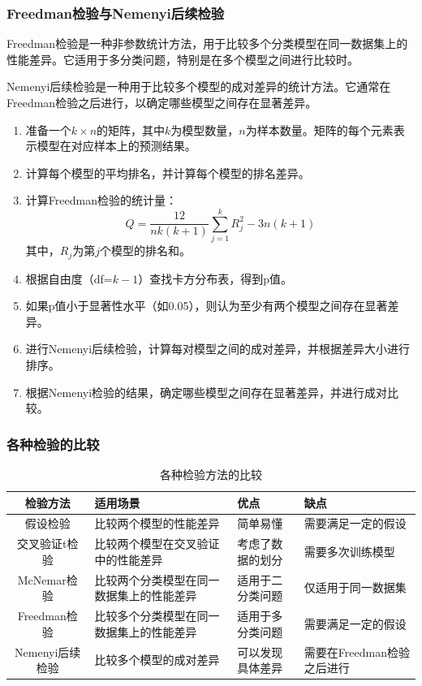 \subsubsection{Freedman检验与Nemenyi后续检验}
Freedman检验是一种非参数统计方法，用于比较多个分类模型在同一数据集上的性能差异。它适用于多分类问题，特别是在多个模型之间进行比较时。

Nemenyi后续检验是一种用于比较多个模型的成对差异的统计方法。它通常在Freedman检验之后进行，以确定哪些模型之间存在显著差异。
\begin{enumerate}
    \item 准备一个$k \times n$的矩阵，其中$k$为模型数量，$n$为样本数量。矩阵的每个元素表示模型在对应样本上的预测结果。
    \item 计算每个模型的平均排名，并计算每个模型的排名差异。
    \item 计算Freedman检验的统计量：
    \begin{equation}
        Q = \frac{12}{n k (k + 1)} \sum_{j=1}^{k} R_j^2 - 3n(k + 1)
    \end{equation}
    其中，$R_j$为第$j$个模型的排名和。
    \item 根据自由度（df=$k-1$）查找卡方分布表，得到p值。
    \item 如果p值小于显著性水平（如0.05），则认为至少有两个模型之间存在显著差异。
    \item 进行Nemenyi后续检验，计算每对模型之间的成对差异，并根据差异大小进行排序。
    \item 根据Nemenyi检验的结果，确定哪些模型之间存在显著差异，并进行成对比较。
\end{enumerate}

\subsubsection{各种检验的比较}
\begin{table}[H]
    \centering
    \captionsetup{justification=centering} %
    \begin{tabular}{c p{4cm} p{3cm} p{3cm}}
        \toprule
        检验方法 & 适用场景 & 优点 & 缺点 \\
        \midrule
        假设检验 & 比较两个模型的性能差异 & 简单易懂 & 需要满足一定的假设 \\

        交叉验证t检验 & 比较两个模型在交叉验证中的性能差异 & 考虑了数据的划分 & 需要多次训练模型 \\
 
        McNemar检验 & 比较两个分类模型在同一数据集上的性能差异 & 适用于二分类问题 & 仅适用于同一数据集 \\
 
        Freedman检验 & 比较多个分类模型在同一数据集上的性能差异 & 适用于多分类问题 & 需要满足一定的假设 \\
 
        Nemenyi后续检验 & 比较多个模型的成对差异 & 可以发现具体差异 & 需要在Freedman检验之后进行 \\
        \bottomrule
    \end{tabular}
    \caption{各种检验方法的比较}
    \label{tab:comparison}
\end{table}


